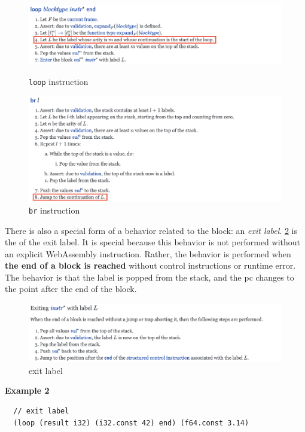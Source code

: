 \begin{figure}[h!]
    \centerline{\includegraphics[width=15cm]{fig/loop}}
    \caption[Enter the caption title here]{\texttt{loop} instruction} \label{fig:loop}
    \centerline{\includegraphics[width=15cm]{fig/br}}
    \caption[Enter the caption title here]{\texttt{br} instruction} \label{fig:br}
\end{figure}


There is also a special form of a behavior related to the block: an
\textit{exit label}.
\cref{fig:exit-label} is the \officialp of the exit label.
It is special because this behavior is not performed without an explicit
WebAssembly instruction.
Rather, the behavior is performed when \textbf{the end of a block is reached}
without control instructions or runtime error.
The behavior is that the label is popped from the stack, and the pc changes to
the point after the end of the block.

\begin{figure}[h!]
    \centerline{\includegraphics[width=15cm]{fig/exit}}
    \caption[Enter the caption title here]{exit label} \label{fig:exit-label}
\end{figure}


\textbf{Example 2}
\begin{verbatim}
  // exit label
  (loop (result i32) (i32.const 42) end) (f64.const 3.14)
\end{verbatim}

